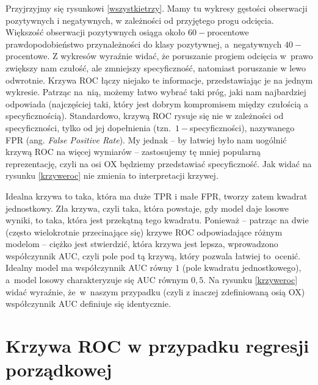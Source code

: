 \documentclass{mini}
\begin{document}
Przyjrzyjmy się rysunkowi \ref{wszystkietrzy}. Mamy tu wykresy gęstości obserwacji pozytywnych i negatywnych, w zależności od przyjętego progu odcięcia. Większość obserwacji pozytywnych osiąga około $60-$procentowe prawdopodobieństwo przynależności do klasy pozytywnej, a~negatywnych $40-$procentowe. Z wykresów wyraźnie widać, że poruszanie progiem odcięcia w~prawo zwiększy nam czułość, ale zmniejszy specyficzność, natomiast poruszanie w lewo odwrotnie. Krzywa ROC łączy niejako te informacje, przedstawiając je na jednym wykresie. Patrząc na~nią, możemy łatwo wybrać taki próg, jaki nam najbardziej odpowiada (najczęściej taki, który jest dobrym kompromisem między czułością a specyficznością). Standardowo, krzywą ROC rysuje się nie w zależności od specyficzności, tylko od jej dopełnienia (tzn.~$1-$specyficzności), nazywanego FPR (ang. \textit{False Positive Rate}). My jednak -- by łatwiej było nam uogólnić krzywą ROC na więcej wymiarów -- zastosujemy tę mniej popularną reprezentację, czyli na osi OX będziemy przedstawiać specyficzność. Jak widać na rysunku \ref{krzyweroc} nie zmienia to interpretacji krzywej.

Idealna krzywa to taka, która ma duże TPR i małe FPR, tworzy zatem kwadrat jednostkowy. Zła krzywa, czyli taka, która powstaje, gdy model daje losowe wyniki, to taka, która jest przekątną tego kwadratu. Ponieważ -- patrząc na dwie (często wielokrotnie przecinające się) krzywe ROC odpowiadające różnym modelom -- ciężko jest stwierdzić, która krzywa jest lepsza, wprowadzono współczynnik AUC, czyli pole pod tą krzywą, który pozwala łatwiej to~ocenić. Idealny model ma współczynnik AUC równy $1$ (pole kwadratu jednostkowego), a~model losowy charakteryzuje się AUC równym $0,5$. Na rysunku \ref{krzyweroc} widać wyraźnie, że~w~naszym przypadku (czyli z inaczej zdefiniowaną osią OX) współczynnik AUC definiuje się identycznie.       

\section{Krzywa ROC w przypadku regresji porządkowej}
\end{document}
